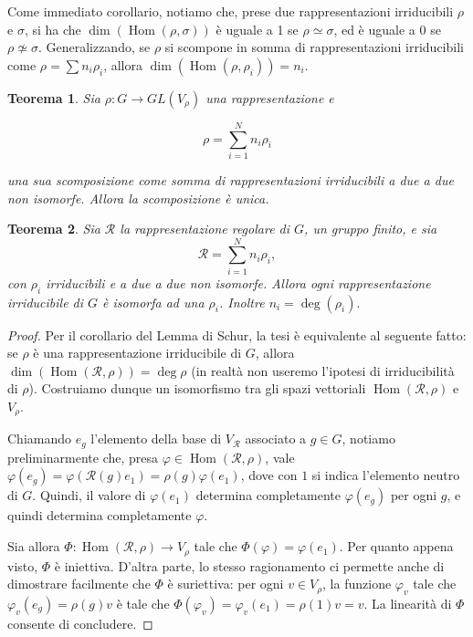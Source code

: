 \documentclass[11pt]{article}
\theoremstyle{plain}
\newtheorem{thm}{Teorema}[section]
\theoremstyle{definition}
\theoremstyle{remark}
\newcommand{\dsum}{\displaystyle\sum}
\DeclareMathOperator{\Hom}{Hom}
\begin{document}
Come immediato corollario, notiamo che, prese due rappresentazioni irriducibili $\rho$ e $\sigma$, si ha che $\dim\left(\Hom(\rho,\sigma)\right)$ è uguale a 1 se $\rho\simeq\sigma$, ed è uguale a 0 se $\rho\not\simeq\sigma$. Generalizzando, se $\rho$ si scompone in somma di rappresentazioni irriducibili come $\rho=\sum n_i\rho_i$, allora $\dim\left(\Hom(\rho,\rho_i)\right)=n_i$.



\begin{thm}
Sia $\rho: G \to GL(V_\rho)$ una rappresentazione e 

\[\rho = \dsum_{i=1}^N n_i \rho_i \]

una sua scomposizione come somma di rappresentazioni irriducibili a due a due non isomorfe. Allora la scomposizione è unica.
\end{thm}






\begin{thm}
Sia $\mathcal{R}$ la rappresentazione regolare di $G$, un gruppo finito, e sia 
\[ \mathcal{R} = \dsum_{i=1}^Nn_i \rho_i,\]
con $\rho_i$ irriducibili e a due a due non isomorfe. Allora ogni rappresentazione irriducibile di $G$ è isomorfa ad una $\rho_i$. Inoltre $n_i = \deg(\rho_i).$ 
\label{thm: teorema importantissimo}
\end{thm}
\begin{proof}
Per il corollario del Lemma di Schur, la tesi è equivalente al seguente fatto: se $\rho$ è una rappresentazione irriducibile di $G$, allora $\dim\left(\Hom(\mathcal{R},\rho)\right)=\deg\rho$ (in realtà non useremo l'ipotesi di irriducibilità di $\rho$). Costruiamo dunque un isomorfismo tra gli spazi vettoriali $\Hom(\mathcal{R},\rho)$ e $V_\rho$.

Chiamando $e_g$ l'elemento della base di $V_\mathcal{R}$ associato a $g\in G$, notiamo preliminarmente che, presa $\varphi\in\Hom(\mathcal{R},\rho)$, vale $\varphi(e_g)=\varphi(\mathcal{R}(g)e_{1})=\rho(g)\varphi(e_1)$, dove con $1$ si indica l'elemento neutro di $G$. Quindi, il valore di $\varphi(e_1)$ determina completamente $\varphi(e_g)$ per ogni $g$, e quindi determina completamente $\varphi$.

Sia allora $\Phi\colon\Hom(\mathcal{R},\rho)\to V_\rho$ tale che $\Phi(\varphi)=\varphi(e_{1})$. Per quanto appena visto, $\Phi$ è iniettiva. D'altra parte, lo stesso ragionamento ci permette anche di dimostrare facilmente che $\Phi$ è suriettiva: per ogni $v\in V_\rho$, la funzione $\varphi_v$ tale che $\varphi_v(e_g)=\rho(g)v$ è tale che $\Phi(\varphi_v)=\varphi_v(e_1)=\rho(1)v=v$. La linearità di $\Phi$ consente di concludere.
\end{proof}
\end{document}
